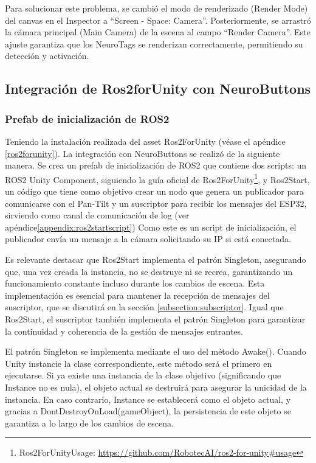 Para solucionar este problema, se cambió el modo de renderizado (Render Mode) del canvas en el Inspector a ``Screen - Space: Camera''. Posteriormente, se arrastró la cámara principal (Main Camera) de la escena al campo ``Render Camera''. Este ajuste garantiza que los NeuroTags se renderizan correctamente, permitiendo su detección y activación.

\subsection{Integración de Ros2forUnity con NeuroButtons}

\subsubsection{Prefab de inicialización de ROS2}
Teniendo la instalación realizada del asset Ros2ForUnity (véase el apéndice \ref{ros2forunity}). La integración con NeuroButtons se realizó de la siguiente manera. Se crea un prefab de inicialización de ROS2 que contiene dos scripts: un ROS2 Unity Component, siguiendo la guía oficial de Ros2ForUnity\footnote{Ros2ForUnityUsage: \url{https://github.com/RobotecAI/ros2-for-unity\#usage}}, y Ros2Start, un código que tiene como objetivo crear un nodo que genera un publicador para comunicarse con el Pan-Tilt y un suscriptor para recibir los mensajes del ESP32, sirviendo como canal de comunicación de log (ver ap\'endice\ref{appendix:ros2startscript}) Como este es un script de inicialización, el publicador envía un mensaje a la cámara solicitando su IP si está conectada.



Es relevante destacar que Ros2Start implementa el patrón Singleton, asegurando que, una vez creada la instancia, no se destruye ni se recrea, garantizando un funcionamiento constante incluso durante los cambios de escena. Esta implementación es esencial para mantener la recepción de mensajes del suscriptor, que se discutirá en la sección \ref{subsection:subscriptor}. Igual que Ros2Start, el suscriptor también implementa el patrón Singleton para garantizar la continuidad y coherencia de la gestión de mensajes entrantes.



El patrón Singleton se implementa mediante el uso del método Awake(). Cuando Unity instancie la clase correspondiente, este método será el primero en ejecutarse. Si ya existe una instancia de la clase objetivo (significando que Instance no es nula), el objeto actual se destruirá para asegurar la unicidad de la instancia. En caso contrario, Instance se establecerá como el objeto actual, y gracias a DontDestroyOnLoad(gameObject), la persistencia de este objeto se garantiza a lo largo de los cambios de escena.



